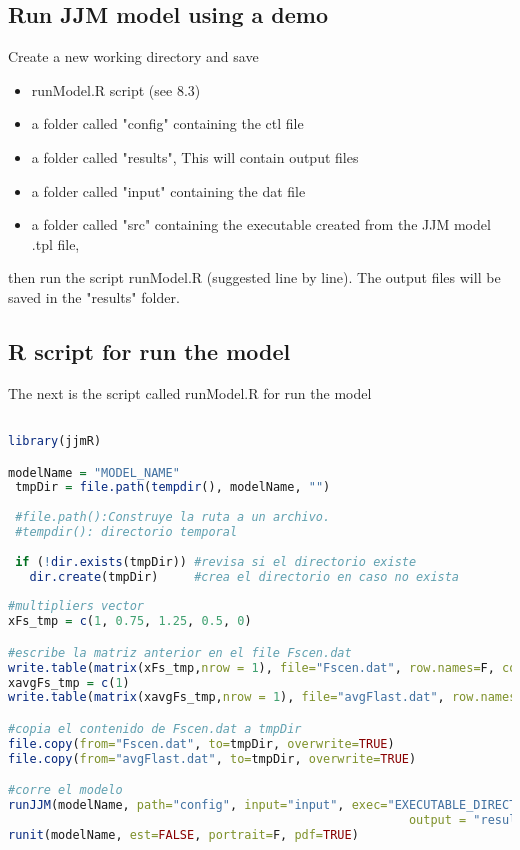 \documentclass{article}
\begin{document}
\subsection{Run JJM model using a demo}
Create a new working directory and save  
\begin{itemize}
    \item runModel.R script (see 8.3)
    \item a folder called "config" containing the ctl file
    \item a folder called "results", This will contain output files
    \item a folder called "input" containing the dat file
    \item a folder called "src" containing the executable created from the JJM model .tpl file,
\end{itemize}
then run the script runModel.R (suggested line by line). The output files will be saved in the "results" folder.
\subsection{R script for run the model}
The next is the script called runModel.R for run the model 
\begin{lstlisting}[language=R]

library(jjmR)

modelName = "MODEL_NAME"
 tmpDir = file.path(tempdir(), modelName, "")
 
 #file.path():Construye la ruta a un archivo.
 #tempdir(): directorio temporal
 
 if (!dir.exists(tmpDir)) #revisa si el directorio existe
   dir.create(tmpDir)     #crea el directorio en caso no exista
   
#multipliers vector
xFs_tmp = c(1, 0.75, 1.25, 0.5, 0) 

#escribe la matriz anterior en el file Fscen.dat
write.table(matrix(xFs_tmp,nrow = 1), file="Fscen.dat", row.names=F, col.names=F) 
xavgFs_tmp = c(1) 
write.table(matrix(xavgFs_tmp,nrow = 1), file="avgFlast.dat", row.names=F, col.names=F)

#copia el contenido de Fscen.dat a tmpDir
file.copy(from="Fscen.dat", to=tmpDir, overwrite=TRUE) 
file.copy(from="avgFlast.dat", to=tmpDir, overwrite=TRUE)

#corre el modelo
runJJM(modelName, path="config", input="input", exec="EXECUTABLE_DIRECTORY", 
                                                        output = "results/")
runit(modelName, est=FALSE, portrait=F, pdf=TRUE)
\end{lstlisting}
\end{document}
